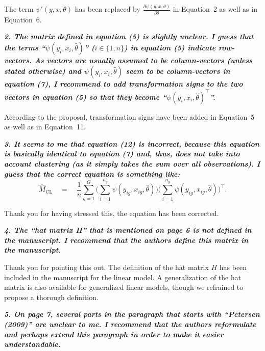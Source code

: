 \documentclass[10pt,a4paper]{article}
\begin{document}
The term $\psi'(y, x, \theta)$ has been replaced by $\frac{\partial \psi(y, x, \theta)}{\partial\theta}$ in Equation~2 as well as in Equation~6.

\medskip

\textbf{\textit{2. The matrix defined in equation (5) is slightly unclear. I guess that the terms ``$\psi(y_i, x_i, \hat\theta)$'' ($i \in \{1, n\}$) in equation (5) indicate row-vectors. As vectors are usually assumed to be column-vectors (unless stated otherwise) and $\psi(y_i, x_i, \hat\theta)$ seem to be column-vectors in
equation (7), I recommend to add transformation signs to the two vectors in equation (5)
so that they become ``$\psi(y_i, x_i, \hat\theta)^\top$''.}}

\medskip

According to the proposal, transformation signs have been added in Equation~5 as well as in Equation~11. 

\medskip

\textbf{\textit{3. It seems to me that equation (12) is incorrect, because this equation is basically identical
to equation (7) and, thus, does not take into account clustering (as it simply takes the
sum over all observations). I guess that the correct equation is something like:
\begin{equation}
  \hat M_\mathrm{CL} \quad = \quad \frac{1}{n} \sum_{g = 1}^G\bigg(\sum_{i = 1}^{n_{g}}\psi(y_{ig}, x_{ig}, \hat \theta) \bigg) \bigg(\sum_{i = 1}^{n_{g}} \psi(y_{ig}, x_{ig}, \hat \theta) \bigg)^\top.
\end{equation}}}

\medskip

Thank you for having stressed this, the equation has been corrected. 

\medskip

\textbf{\textit{4. The ``hat matrix H'' that is mentioned on page 6 is not defined in the manuscript. I
recommend that the authors define this matrix in the manuscript.}}

\medskip

Thank you for pointing this out. The definition of the hat matrix $H$ has been included in the manuscript for the linear model.
A generalization of the hat matrix is also available for generalized linear models, though we refrained to propose a thorough definition.

\medskip

\textbf{\textit{5. On page 7, several parts in the paragraph that starts with ``Petersen (2009)'' are unclear
to me. I recommend that the authors reformulate and perhaps extend this paragraph in
order to make it easier understandable.}}
\end{document}
